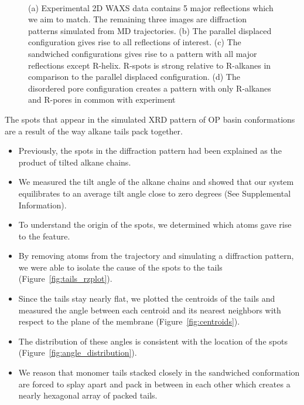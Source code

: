 \documentclass{article}
\begin{document}
\begin{figure}[ht]
\begin{subfigure}{0.14\linewidth}
  \end{subfigure}
  \caption{(a) Experimental 2D WAXS data contains 5 major reflections which we aim to match. The remaining
  three images are diffraction patterns simulated from MD trajectories. (b) The parallel displaced
  configuration gives rise to all reflections of interest. (c) The sandwiched configurations gives rise to a
  pattern with all major reflections except R-helix. R-spots is strong relative to R-alkanes in comparison
  to the parallel displaced configuration. (d) The disordered pore configuration creates a pattern with only
  R-alkanes and R-pores in common with experiment}~\label{fig:xrd}
  \end{figure}

  The spots that appear in the simulated XRD pattern of OP basin
  conformations are a result of the way alkane tails pack together.
  \begin{itemize}
  	\item Previously, the spots in the diffraction pattern had been explained 
	as the product of tilted alkane chains.
	\item We measured the tilt angle of the alkane chains and showed that our 
	system equilibrates to an average tilt angle close to zero degrees (See Supplemental Information). 
	\item To understand the origin of the spots, we determined which atoms gave rise to the feature.
	\item By removing atoms from the trajectory and simulating a diffraction 
	pattern, we were able to isolate the cause of the spots to the tails (Figure~\ref{fig:tails_rzplot}).
	\item Since the tails stay nearly flat, we plotted the centroids of the 
	tails and measured the angle between each centroid and its nearest neighbors
	with respect to the plane of the membrane (Figure~\ref{fig:centroids}).
	\item The distribution of these angles is consistent with the location of 
	the spots (Figure~\ref{fig:angle_distribution}).
	\item We reason that monomer tails stacked closely in the sandwiched conformation
	are forced to splay apart and pack in between in each other which creates a
	nearly hexagonal array of packed tails. 
  \end{itemize}
  
\end{document}
